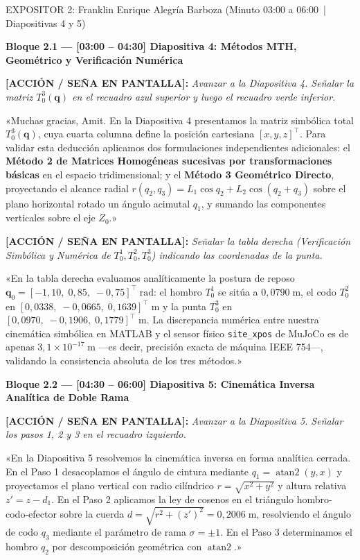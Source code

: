 \documentclass[11pt,a4paper]{article}
\newcommand{\accion}[1]{%
  \par\smallskip\noindent%
  {\color{uniGranate}\textbf{[ACCIÓN / SEÑA EN PANTALLA]:}} {\itshape\color{uniAzul!90!black} #1}\par\smallskip%
}
\newcommand{\speech}[1]{%
  \noindent{\color{verdeOk!85!black}\textbf{[SPEECH]:}} «#1»\par\medskip%
}
\begin{document}
\begin{cajaexpositor}[uniGranate]{EXPOSITOR 2: Franklin Enrique Alegría Barboza (Minuto 03:00 a 06:00 \,|\, Diapositivas 4 y 5)}

\textbf{\color{uniGranate}Bloque 2.1 --- [03:00 -- 04:30] Diapositiva 4: Métodos MTH, Geométrico y Verificación Numérica}
\accion{Avanzar a la Diapositiva 4. Señalar la matriz $T_0^3(\bm{q})$ en el recuadro azul superior y luego el recuadro verde inferior.}
\speech{Muchas gracias, Amit. En la Diapositiva 4 presentamos la matriz simbólica total $T_0^3(\bm{q})$, cuya cuarta columna define la posición cartesiana $[x, y, z]^\top$. Para validar esta deducción aplicamos dos formulaciones independientes adicionales: el \textbf{Método 2 de Matrices Homogéneas sucesivas por transformaciones básicas} en el espacio tridimensional; y el \textbf{Método 3 Geométrico Directo}, proyectando el alcance radial $r(q_2, q_3) = L_1\cos q_2 + L_2\cos(q_2+q_3)$ sobre el plano horizontal rotado un ángulo acimutal $q_1$, y sumando las componentes verticales sobre el eje $Z_0$.}

\accion{Señalar la tabla derecha (\emph{Verificación Simbólica y Numérica de $T_0^1, T_0^2, T_0^3$}) indicando las coordenadas de la punta.}
\speech{En la tabla derecha evaluamos analíticamente la postura de reposo $\bm{q}_0 = [-1{,}10,\; 0{,}85,\; -0{,}75]^\top\;\text{rad}$: el hombro $T_0^1$ se sitúa a $0{,}0790\;\text{m}$, el codo $T_0^2$ en $[0{,}0338,\; -0{,}0665,\; 0{,}1639]^\top\;\text{m}$ y la punta $T_0^3$ en $[0{,}0970,\; -0{,}1906,\; 0{,}1779]^\top\;\text{m}$. La discrepancia numérica entre nuestra cinemática simbólica en MATLAB y el sensor físico \texttt{site\_xpos} de MuJoCo es de apenas $3{,}1\times 10^{-17}\;\text{m}$ —es decir, precisión exacta de máquina IEEE 754—, validando la consistencia absoluta de los tres métodos.}

\textbf{\color{uniGranate}Bloque 2.2 --- [04:30 -- 06:00] Diapositiva 5: Cinemática Inversa Analítica de Doble Rama}
\accion{Avanzar a la Diapositiva 5. Señalar los pasos 1, 2 y 3 en el recuadro izquierdo.}
\speech{En la Diapositiva 5 resolvemos la cinemática inversa en forma analítica cerrada. En el Paso 1 desacoplamos el ángulo de cintura mediante $q_1 = \operatorname{atan2}(y, x)$ y proyectamos el plano vertical con radio cilíndrico $r = \sqrt{x^2+y^2}$ y altura relativa $z' = z - d_1$. En el Paso 2 aplicamos la ley de cosenos en el triángulo hombro-codo-efector sobre la cuerda $d = \sqrt{r^2 + (z')^2} = 0{,}2006\;\text{m}$, resolviendo el ángulo de codo $q_3$ mediante el parámetro de rama $\sigma = \pm 1$. En el Paso 3 determinamos el hombro $q_2$ por descomposición geométrica con $\operatorname{atan2}$.}


\end{cajaexpositor}
\end{document}
